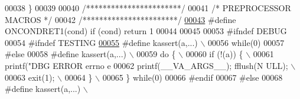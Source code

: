 \begin{DoxyCode}
00038 \}
00039 
00040                 \textcolor{comment}{/***********************/}
00041                 \textcolor{comment}{/* PREPROCESSOR MACROS */}
00042                 \textcolor{comment}{/***********************/}
\hypertarget{macro_8h_source_l00043}{}\hyperlink{macro_8h_a187fa7a4ed5c7b7e5bc7a8d7fc1b86cf}{00043} \textcolor{preprocessor}{#define ONCONDRET1(cond) if (cond) return 1}
00044 \textcolor{preprocessor}{}
00045 
00053 \textcolor{preprocessor}{#ifndef DEBUG}
00054 \textcolor{preprocessor}{}\textcolor{preprocessor}{        #ifndef TESTING}
\hypertarget{macro_8h_source_l00055}{}\hyperlink{macro_8h_a1eb49ad6c54663208db1fcc1260a8f6f}{00055} \textcolor{preprocessor}{}\textcolor{preprocessor}{        #define kassert(a,...) \(\backslash\)}
00056 \textcolor{preprocessor}{                        while(0)}
00057 \textcolor{preprocessor}{}\textcolor{preprocessor}{        #else}
00058 \textcolor{preprocessor}{}\textcolor{preprocessor}{        #define kassert(a,...)                                                                                                          \(\backslash\)
      }
00059 \textcolor{preprocessor}{                        do \{                                                                                                                            \(\backslash\)
      }
00060 \textcolor{preprocessor}{                                if (!(a)) \{                                                                                                     \(\backslash\)
      }
00061 \textcolor{preprocessor}{                                        printf("DBG ERROR errno %
      e %
00062 \textcolor{preprocessor}{                                        printf(\_\_VA\_ARGS\_\_);             fflush(N
      ULL);                                   \(\backslash\)}
00063 \textcolor{preprocessor}{                                        exit(1);                                                                                                        \(\backslash\)
      }
00064 \textcolor{preprocessor}{                                \}                                                                                                                               \(\backslash\)
      }
00065 \textcolor{preprocessor}{                        \} while(0)}
00066 \textcolor{preprocessor}{}\textcolor{preprocessor}{        #endif}
00067 \textcolor{preprocessor}{}\textcolor{preprocessor}{#else}
00068 \textcolor{preprocessor}{}\textcolor{preprocessor}{#define kassert(a,...)                                                                                                                  \(\backslash\)
}}
\end{DoxyCode}
